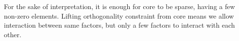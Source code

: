 For the sake of interpretation, it is enough for core to be sparse, having a few non-zero elements. Lifting orthogonality constraint from core means we allow interaction between same factors, but only a few factors to interact with each other. 
